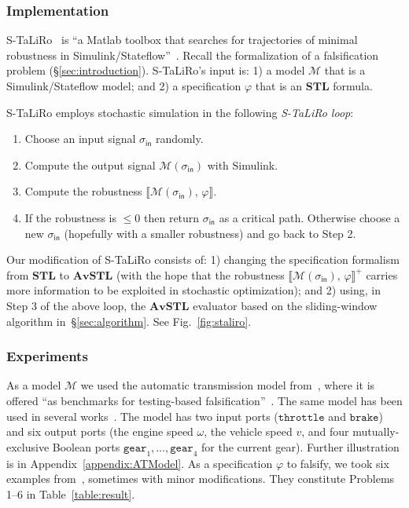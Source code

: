 \documentclass[envcountsect,orivec]{llncs} \usepackage{etex} \usepackage[]{graphicx}
\newcommand{\STL}{\textbf{STL}}
\newcommand{\Robust}[2]{{ \llbracket #1,\, #2 \rrbracket}}
\newcommand{\AvSTL}{\textbf{AvSTL}}
\begin{document}
\subsubsection{Implementation}
S-TaLiRo~\cite{DBLP:conf/tacas/AnnpureddyLFS11} is 
``a Matlab toolbox that searches for trajectories of minimal robustness
in Simulink/Stateflow''~\cite{WEB:S_TaLiRo}. Recall the formalization of 
a falsification problem (\S{}\ref{sec:introduction}). S-TaLiRo's input
is:  1) a
model $\mathcal{M}$ that is a Simulink/Stateflow model; and 2) a specification
$\varphi$ that is an $\STL$ formula. 

S-TaLiRo employs stochastic simulation in the following 
\emph{S-TaLiRo loop}: 
\begin{enumerate}
 \item Choose an input signal $\sigma_{\mathsf{in}}$  randomly.
 \item Compute the output signal
       $\mathcal{M}(\sigma_{\mathsf{in}})$ with Simulink.
 \item Compute the robustness
  $\Robust{\mathcal{M}(\sigma_{\mathsf{in}})}{\varphi}$.
 \item If the robustness is $\leq 0$ then return $\sigma_{\mathsf{in}}$
  as a critical path. Otherwise choose a new $\sigma_{\mathsf{in}}$ 
  (hopefully with a smaller robustness)
    and go back to Step 2.
\end{enumerate}
Our  modification of S-TaLiRo consists of: 1) changing the specification formalism from
$\STL$ to $\AvSTL$ (with the hope that the robustness
$\Robust{\mathcal{M}(\sigma_{\mathsf{in}})}{\varphi}^+$ carries more
information to be exploited in stochastic optimization); and 2) using, in
 Step 3 of the above loop, the $\AvSTL$
evaluator based on the sliding-window algorithm
in~\S{}\ref{sec:algorithm}. 
See  Fig.~\ref{fig:staliro}.














\subsubsection{Experiments}
As a model $\mathcal{M}$ we used the automatic transmission model
from~\cite{HoxhaAF14arch1}, where it is offered ``as benchmarks
        for testing-based falsification''~\cite{HoxhaAF14arch1}.
The same model has been used 
in several works~\cite{DBLP:conf/pts/YangHF12, 6315384, DBLP:conf/hybrid/JinDDS13}.
The model has two input ports (\emph{$\mathtt{throttle}$} and
\emph{$\mathtt{brake}$}) and six output ports (the engine speed $\omega$, 
the vehicle speed $v$, and four mutually-exclusive Boolean ports
 $\mathtt{gear}_{1},\dotsc,\mathtt{gear}_{4}$ for the current gear).
Further illustration  is in Appendix~\ref{appendix:ATModel}.
As a specification $\varphi$ to  falsify, we took six examples from~\cite{HoxhaAF14arch1},
sometimes with minor modifications. They constitute Problems 1--6 in Table~\ref{table:result}.
\end{document}
